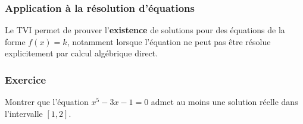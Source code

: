\documentclass[12pt,a4paper]{article}
\begin{document}
\subsubsection*{Application à la résolution d'équations}
Le TVI permet de prouver l'\textbf{existence} de solutions pour des équations de la forme $f(x) = k$, notamment lorsque l'équation ne peut pas être résolue explicitement par calcul algébrique direct.

\subsubsection*{Exercice}
Montrer que l'équation $x^5 - 3x - 1 = 0$ admet au moins une solution réelle dans l'intervalle $[1, 2]$.
\end{document}
